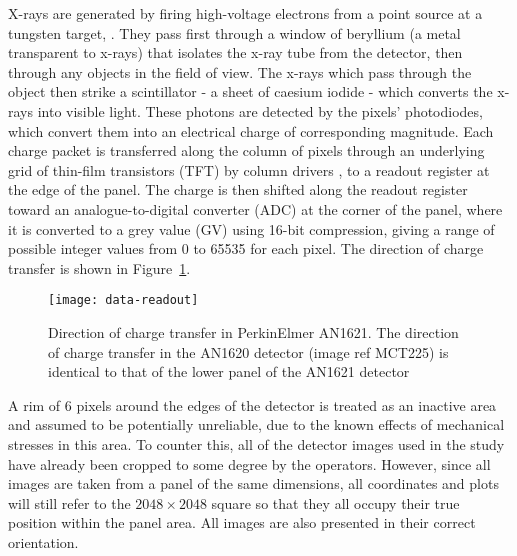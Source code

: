 \documentclass[\main/IO-Pixels.tex]{subfiles}
\begin{document}
X-rays are generated by firing high-voltage electrons from a point source  at a tungsten target, . They pass first through a window of beryllium (a metal transparent to x-rays) that isolates the x-ray tube from the detector, then through any objects in the field of view. The x-rays which pass through the object then strike a scintillator - a sheet of caesium iodide - which converts the x-rays into visible light. These photons are detected by the pixels' photodiodes, which convert them into an electrical charge of corresponding magnitude. Each charge packet is transferred  along the column of pixels through an underlying grid of thin-film transistors (TFT) by column drivers , to a readout register at the edge of the panel. The charge is then shifted along the readout register toward an analogue-to-digital converter (ADC) at the corner of the panel, where it is converted to a grey value (GV) using 16-bit compression, giving a range of possible integer values from 0 to 65535 for each pixel. The direction of charge transfer is shown in Figure~\ref{fig:charge-transfer-direction}. 

\begin{figure}[!ht]
\caption{ Direction of charge transfer in PerkinElmer AN1621. The direction of charge transfer in the AN1620 detector (image ref MCT225) is identical to that of the lower panel of the AN1621 detector }
\label{fig:charge-transfer-direction}
\texttt{[image: data-readout]}
\end{figure} 


A rim of 6 pixels around the edges of the detector is treated as an inactive area and assumed to be potentially unreliable, due to the known effects of mechanical stresses in this area. To counter this, all of the detector images used in the study have already been cropped to some degree by the operators.  However, since all images are taken from a panel of the same dimensions, all coordinates and plots will still refer to the $2048 \times 2048$ square so that they all occupy their true position within the panel area. All images are also presented in their correct orientation.
  
\end{document}

